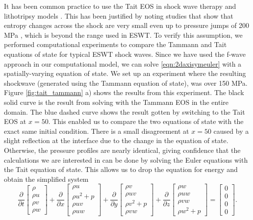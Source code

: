 \documentclass{article}
\begin{document}
It has been common practice to use the Tait EOS in shock wave therapy and lithotripsy 
models \cite{saito,nakahara}.  
This has been justified by noting studies that show that entropy changes across the shock are very small 
even
up to pressure jumps of 200 MPa \cite{nakahara}, which is beyond the range used in ESWT.
To verify this assumption, we performed computational experiments to compare the Tammann and Tait 
equations of state for typical ESWT shock waves.  Since we have used the f-wave approach in our computational model, we can solve \ref{eqn:2daxisymeuler} with a spatially-varying equation of state.  We set up an experiment where the resulting shockwave (generated using the Tammann equation of state), was over 150 MPa.  Figure \ref{fig:tait_tammann} a) shows the results from this experiment.  The black solid curve is the result from solving with the Tammann EOS in the entire domain.  The blue dashed curve shows the result gotten by switching to the Tait EOS at $x=50$.  This enabled us to compare the two equations of state with the exact same initial condition.  There is a small disagreement at $x=50$ caused by a slight reflection at the interface due to the change in the equation of state.  Otherwise, the pressure profiles are nearly identical, giving
confidence that the calculations we are interested in can be done by solving the Euler equations with the 
Tait equation of state. This allows us to drop the equation for energy and obtain the simplified system
\begin{equation}
	\frac{\partial}{\partial t} \left[ \begin{array}{c} \rho \\ \rho u \\ \rho v \\ \rho w \end{array} \right] +
	\frac{\partial}{\partial x} \left[ \begin{array}{c} \rho u \\ \rho u^2 + p \\ \rho u v \\ \rho uw \end{array} \right] + 
	\frac{\partial}{\partial y} \left[ \begin{array}{c} \rho v \\ \rho u v\\ \rho v^2 + p \\ \rho vw \end{array} \right ] +
	\frac{\partial}{\partial z} \left[\begin{array}{c} \rho w \\ \rho uw \\ \rho vw \\ \rho w^2 + p \end{array} \right ] = 
	\left[ \begin{array}{c} 0 \\ 0 \\0 \\0 \end{array}\right ]. 
	\label{eqn:isentropic}
\end{equation}
\end{document}
